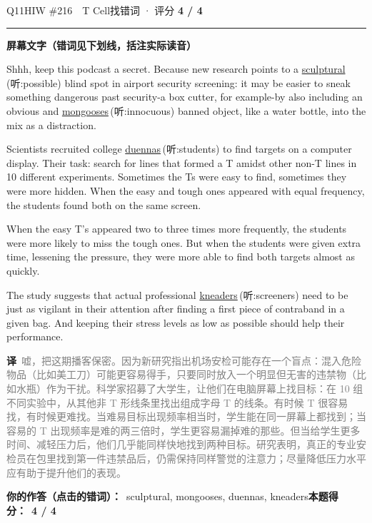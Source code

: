 \documentclass[11pt]{article}
\newcommand{\ptesub}[1]{%
  \par\needspace{2\baselineskip}\smallskip
  {\color{cAccent}\rule[-0.2ex]{3pt}{1.05em}}\hspace{6pt}%
  {\bfseries\color{cHead}#1}\par\nopagebreak\smallskip}
\newcommand{\zh}[1]{{\footnotesize\textcolor{cNote}{\textbf{译}}\ \textcolor{gray}{#1}}}
\newcommand{\hiw}[2]{{\color{cWrong}\uline{#1}}\,{\footnotesize\color{cFix}(听:#2)}} %
\begin{document}
\begin{qblock}{Q11\quad HIW \#216\ \ T Cell}{找错词 · 评分 \textcolor{cAccent}{\bfseries 4 / 4}}
\ptesub{屏幕文字（错词见下划线，括注实际读音）}
\begin{promptbox}
Shhh, keep this podcast a secret. Because new research points to a \hiw{sculptural}{possible} blind spot in airport security screening: it may be easier to sneak something dangerous past security-a box cutter, for example-by also including an obvious and \hiw{mongooses}{innocuous} banned object, like a water bottle, into the mix as a distraction.

Scientists recruited college \hiw{duennas}{students} to find targets on a computer display. Their task: search for lines that formed a T amidst other non-T lines in 10 different experiments. Sometimes the Ts were easy to find, sometimes they were more hidden. When the easy and tough ones appeared with equal frequency, the students found both on the same screen.

When the easy T's appeared two to three times more frequently, the students were more likely to miss the tough ones. But when the students were given extra time, lessening the pressure, they were more able to find both targets almost as quickly.

The study suggests that actual professional \hiw{kneaders}{screeners} need to be just as vigilant in their attention after finding a first piece of contraband in a given bag. And keeping their stress levels as low as possible should help their performance.
\end{promptbox}
\zh{嘘，把这期播客保密。因为新研究指出机场安检可能存在一个盲点：混入危险物品（比如美工刀）可能更容易得手，只要同时放入一个明显但无害的违禁物（比如水瓶）作为干扰。科学家招募了大学生，让他们在电脑屏幕上找目标：在 10 组不同实验中，从其他非 T 形线条里找出组成字母 T 的线条。有时候 T 很容易找，有时候更难找。当难易目标出现频率相当时，学生能在同一屏幕上都找到；当容易的 T 出现频率是难的两三倍时，学生更容易漏掉难的那些。但当给学生更多时间、减轻压力后，他们几乎能同样快地找到两种目标。研究表明，真正的专业安检员在包里找到第一件违禁品后，仍需保持同样警觉的注意力；尽量降低压力水平应有助于提升他们的表现。}
\par\smallskip
\textbf{你的作答（点击的错词）：}\ sculptural, mongooses, duennas, kneaders\qquad\textbf{本题得分：}\ {\color{cAccent}\bfseries 4 / 4}
\end{qblock}
\end{document}
